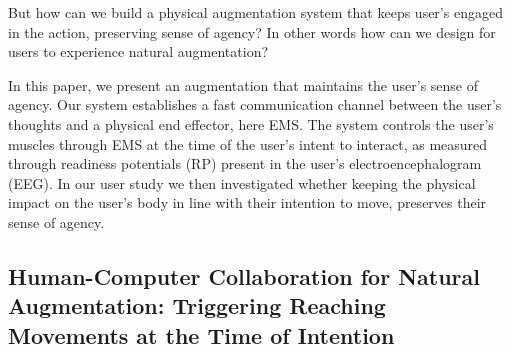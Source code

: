 But how can we build a physical augmentation system that keeps user's engaged in the action, preserving sense of agency? In other words how can we design for users to experience natural augmentation?


In this paper, we present an augmentation that maintains the user's sense of agency. Our system establishes a fast communication channel between the user's thoughts and a physical end effector, here EMS. The system controls the user's muscles through EMS at the time of the user's intent to interact, as measured through readiness potentials (RP) present in the user's electroencephalogram (EEG). In our user study we then investigated whether keeping the physical impact on the user's body in line with their intention to move, preserves their sense of agency.

\subsection{Human-Computer Collaboration for Natural Augmentation: Triggering Reaching Movements at the Time of Intention}




